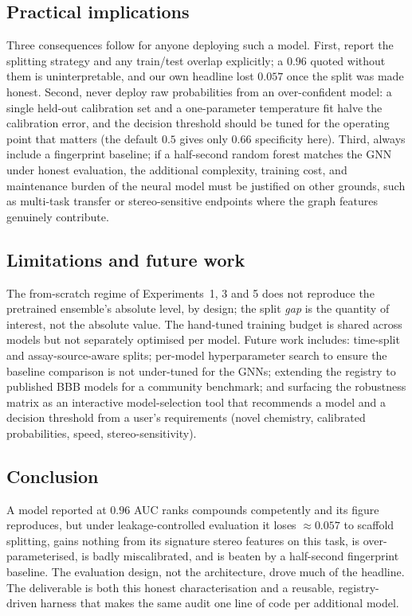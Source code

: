\documentclass[conference]{IEEEtran}
\begin{document}
\subsection{Practical implications}
Three consequences follow for anyone deploying such a model. First, report the
splitting strategy and any train/test overlap explicitly; a $0.96$ quoted without
them is uninterpretable, and our own headline lost $0.057$ once the split was made
honest. Second, never deploy raw probabilities from an over-confident model: a
single held-out calibration set and a one-parameter temperature fit halve the
calibration error, and the decision threshold should be tuned for the operating
point that matters (the default $0.5$ gives only $0.66$ specificity here). Third,
always include a fingerprint baseline; if a half-second random forest matches the
GNN under honest evaluation, the additional complexity, training cost, and
maintenance burden of the neural model must be justified on other grounds, such as
multi-task transfer or stereo-sensitive endpoints where the graph features genuinely
contribute.

\subsection{Limitations and future work}
The from-scratch regime of Experiments~1, 3 and 5 does not reproduce the pretrained
ensemble's absolute level, by design; the split \emph{gap} is the quantity of
interest, not the absolute value. The hand-tuned training budget is shared across
models but not separately optimised per model. Future work includes:
time-split and assay-source-aware splits; per-model hyperparameter search to
ensure the baseline comparison is not under-tuned for the GNNs; extending the
registry to published BBB models for a community benchmark; and surfacing the
robustness matrix as an interactive model-selection tool that recommends a model
and a decision threshold from a user's requirements (novel chemistry, calibrated
probabilities, speed, stereo-sensitivity).

\subsection{Conclusion}
A model reported at $0.96$ AUC ranks compounds competently and its figure
reproduces, but under leakage-controlled evaluation it loses $\approx 0.057$ to
scaffold splitting, gains nothing from its signature stereo features on this task,
is over-parameterised, is badly miscalibrated, and is beaten by a half-second
fingerprint baseline. The evaluation design, not the architecture, drove much of
the headline. The deliverable is both this honest characterisation and a reusable,
registry-driven harness that makes the same audit one line of code per additional
model.
\end{document}
